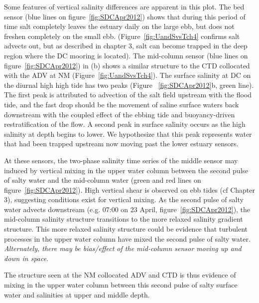 Some features of vertical salinity differences are apparent in this plot. The bed sensor (blue lines on figure~\ref{fig:SDCApr2012}) shows that during this period of time salt completely leaves the estuary daily on the large ebb, but does not freshen completely on the small ebb. (Figure~\ref{fig:UandSvsTch4} confirms salt advects out, but as described in chapter 3, salt can become trapped in the deep region where the DC mooring is located). The mid-column sensor (blue lines on figure~\ref{fig:SDCApr2012}) in (b) shows a similar structure to the CTD collocated with the ADV at NM (Figure~\ref{fig:UandSvsTch4}). The surface salinity at DC on the diurnal high high tide has two peaks (Figure ~\ref{fig:SDCApr2012}b, green line). The first peak is attributed to advection of the salt field upstream with the flood tide, and the fast drop should be the movement of saline surface waters back downstream with the coupled effect of the ebbing tide and buoyancy-driven restratification of the flow. A second peak in surface salinity occurs as the high salinity at depth begins to lower. We hypothesize that this peak represents water that had been trapped upstream now moving past the lower estuary sensors. 

At these sensors, the two-phase salinity time series of the middle sensor may induced by vertical mixing in the upper water column between the second pulse of salty water and the mid-column water (green and red lines on figure~\ref{fig:SDCApr2012}). High vertical shear is observed on ebb tides (cf Chapter 3), suggesting conditions exist for vertical mixing. As the second pulse of salty water advects downstream (e.g. 07:00 on 23 April, figure~\ref{fig:SDCApr2012}), the mid-column salinity structure transitions to the more relaxed salinity gradient structure. This more relaxed salinity structure could be evidence that turbulent processes in the upper water column have mixed the second pulse of salty water.  \emph{Alternately, there may be bias/effect of the mid-column sensor moving up and down in space}.  

The structure seen at the NM collocated ADV and CTD is thus evidence of mixing in the upper water column between this second pulse of salty surface water and salinities at upper and middle depth.

